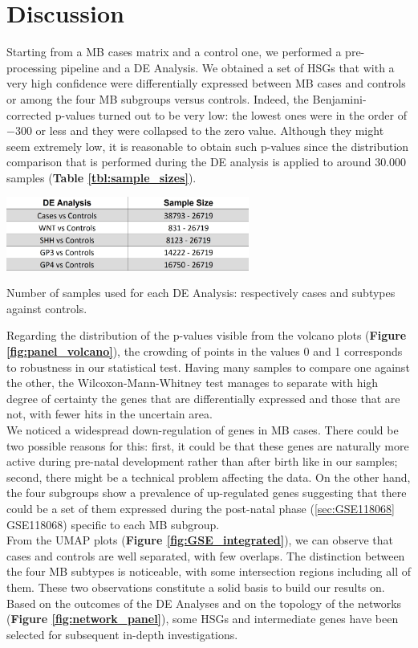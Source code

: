 \documentclass[10pt]{SelfArx} %
\begin{document}
\section{Discussion}\label{sec:discussion}
Starting from a MB cases matrix and a control one, we performed a pre-processing pipeline and a DE Analysis. We obtained a set of HSGs that with a very high confidence were differentially expressed between MB cases and controls or among the four MB subgroups versus controls. Indeed, the Benjamini-corrected p-values turned out to be very low: the lowest ones were in the order of $-300$ or less and they were collapsed to the zero value. Although they might seem extremely low, it is reasonable to obtain such p-values since the distribution comparison that is performed during the DE analysis is applied to around $30.000$ samples (\textbf{Table \ref{tbl:sample_sizes}}).\\

\begin{table}[h!]
  \label{tbl:sample_sizes}
  \centering
    \includegraphics[width=0.6\textwidth]{project-report/figures/sample_sizes.jpeg}
    \caption{Number of samples used for each DE Analysis: respectively cases and subtypes against controls.}  
    \label{tbl:sample_sizes}
\end{table}

Regarding the distribution of the p-values visible from the volcano plots (\textbf{Figure \ref{fig:panel_volcano}}), the crowding of points in the values 0 and 1 corresponds to robustness in our statistical test. Having many samples to compare one against the other, the Wilcoxon-Mann-Whitney test manages to separate with high degree of certainty the genes that are differentially expressed and those that are not, with fewer hits in the uncertain area. \\
We noticed a widespread down-regulation of genes in MB cases. There could be two possible reasons for this: first, it could be that these genes are naturally more active during pre-natal development rather than after birth like in our samples; second, there might be a technical problem affecting the data.
On the other hand, the four subgroups show a prevalence of up-regulated genes suggesting that there could be a set of them expressed during the post-natal phase (\ref{sec:GSE118068} GSE118068) specific to each MB subgroup.\\
From the UMAP plots (\textbf{Figure \ref{fig:GSE_integrated}}), we can observe that cases and controls are well separated, with few overlaps. The distinction between the four MB subtypes is noticeable, with some intersection regions including all of them. These two observations constitute a solid basis to build our results on.\\
Based on the outcomes of the DE Analyses and on the topology of the networks (\textbf{Figure \ref{fig:network_panel}}), some HSGs and intermediate genes have been selected for subsequent in-depth investigations. \\
\end{document}
